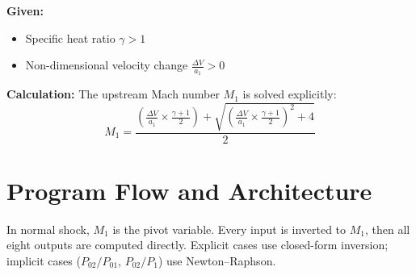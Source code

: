 \textbf{Given:}
\begin{itemize}[nosep]
    \item Specific heat ratio $\gamma > 1$
    \item Non-dimensional velocity change $\frac{\Delta V}{a_1} > 0$
\end{itemize}

\textbf{Calculation:} The upstream Mach number $M_1$ is solved explicitly:
\begin{equation}
M_1 = \frac{\left(\frac{\Delta V}{a_1}\times\frac{\gamma+1}{2}\right) + \sqrt{\left(\frac{\Delta V}{a_1}\times\frac{\gamma+1}{2}\right)^2+4}}{2}
\end{equation}




\section{Program Flow and Architecture}

In normal shock, $M_1$ is the pivot variable. Every input is inverted to $M_1$, then all eight outputs are computed directly. Explicit cases use closed-form inversion; implicit cases ($P_{02}/P_{01}$, $P_{02}/P_1$) use Newton--Raphson.

